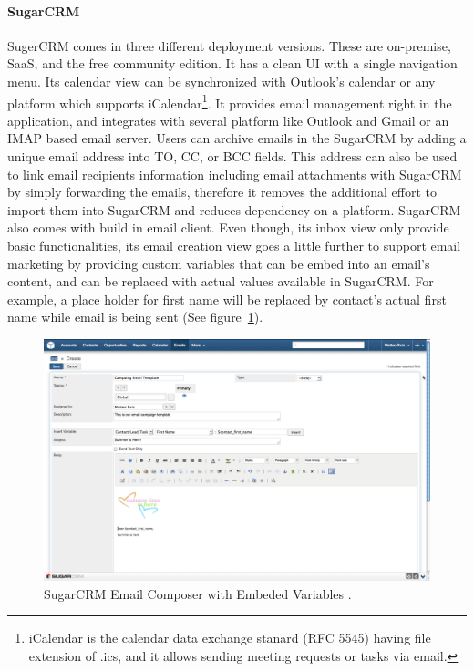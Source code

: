 \paragraph{SugarCRM}
SugerCRM comes in three different deployment versions. These are on-premise, \ac{SaaS}, and the free community edition. It has a clean \ac{UI} with a single navigation menu. Its calendar view can be synchronized with Outlook's calendar or any platform which supports iCalendar\footnote{iCalendar is the calendar data exchange stanard (RFC 5545) having file extension of .ics, and it allows sending meeting requests or tasks via email.}. It provides email management right in the application, and integrates with several platform like Outlook and Gmail or an \ac{IMAP} based email server. Users can archive emails in the SugarCRM by adding a unique email address into TO, \ac{CC}, or \ac{BCC} fields. This address can also be used to link email recipients information including email attachments with SugarCRM by simply forwarding the emails, therefore it removes the additional effort to import them into SugarCRM and reduces dependency on a platform. SugarCRM also comes with build in email client. Even though, its inbox view only provide basic functionalities, its email creation view goes a little further to support email marketing by providing custom variables that can be embed into an email's content, and can be replaced with actual values available in SugarCRM. For example, a place holder for first name will be replaced by contact's actual first name while email is being sent (See figure~\ref{fig:SugarCRM-Create_Email}). 
\vspace{1cm}

\begin{figure}[htbp]
	\includegraphics[width=1.00\textwidth]{imgs/SugarCRM-Create_Email.png}
	\caption[SugarCRM Email Composer with Embeded Variables]{SugarCRM Email Composer with Embeded Variables \citep{SugarCRMInc.2013}.}
	\label{fig:SugarCRM-Create_Email}
\end{figure}

